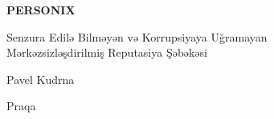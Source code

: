 \thispagestyle{empty}
\begin{center}
  {\sffamily\bfseries\fontsize{34}{40}\selectfont PERSONIX\par}
  \vspace{2.2em}
  {\rmfamily\large Senzura Edilə Bilməyən və Korrupsiyaya Uğramayan\\[0.25em]
   Mərkəzsizləşdirilmiş Reputasiya Şəbəkəsi\par}
\end{center}
\begin{center}
  {\rmfamily\Large Pavel Kudrna\par}
  \vspace{0.45em}
  {\rmfamily\small Praqa\quad\textbullet{}\par}
\end{center}
\clearpage
